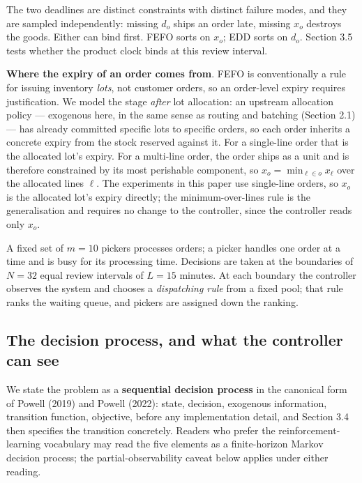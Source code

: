 \documentclass[review,3p,times]{elsarticle}
\theoremstyle{definition}
\begin{document}
The two deadlines are distinct constraints with distinct failure modes,
and they are sampled independently: missing \(d_o\) ships an order late,
missing \(x_o\) destroys the goods. Either can bind first. FEFO sorts on
\(x_o\); EDD sorts on \(d_o\). Section 3.5 tests whether the product
clock binds at this review interval.

\textbf{Where the expiry of an order comes from}. FEFO is conventionally
a rule for issuing inventory \emph{lots}, not customer orders, so an
order-level expiry requires justification. We model the stage
\emph{after} lot allocation: an upstream allocation policy --- exogenous
here, in the same sense as routing and batching (Section 2.1) --- has
already committed specific lots to specific orders, so each order
inherits a concrete expiry from the stock reserved against it. For a
single-line order that is the allocated lot's expiry. For a multi-line
order, the order ships as a unit and is therefore constrained by its
most perishable component, so \(x_o = \min_{\ell \in o} x_\ell\) over
the allocated lines \(\ell\). The experiments in this paper use
single-line orders, so \(x_o\) is the allocated lot's expiry directly;
the minimum-over-lines rule is the generalisation and requires no change
to the controller, since the controller reads only \(x_o\).

A fixed set of \(m = 10\) pickers processes orders; a picker handles one
order at a time and is busy for its processing time. Decisions are taken
at the boundaries of \(N = 32\) equal review intervals of \(L = 15\)
minutes. At each boundary the controller observes the system and chooses
a \emph{dispatching rule} from a fixed pool; that rule ranks the waiting
queue, and pickers are assigned down the ranking.

\subsection{The decision process, and what the controller can
see}\label{the-decision-process-and-what-the-controller-can-see}

We state the problem as a \textbf{sequential decision process} in the
canonical form of Powell (2019) and Powell (2022): state, decision,
exogenous information, transition function, objective, before any
implementation detail, and Section 3.4 then specifies the transition
concretely. Readers who prefer the reinforcement-learning vocabulary may
read the five elements as a finite-horizon Markov decision process; the
partial-observability caveat below applies under either reading.
\end{document}
